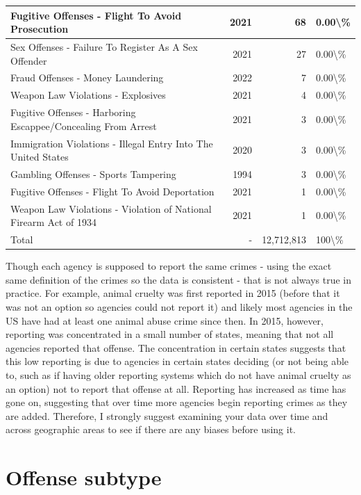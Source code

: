 \documentclass[
]{krantz}
\begin{document}
\begin{longtable}[t]{l|r|r|l}
\hline
Fugitive Offenses - Flight To Avoid Prosecution & 2021 & 68 & 0.00\textbackslash{}\%\\
\hline
Sex Offenses - Failure To Register As A Sex Offender & 2021 & 27 & 0.00\textbackslash{}\%\\
\hline
Fraud Offenses - Money Laundering & 2022 & 7 & 0.00\textbackslash{}\%\\
\hline
Weapon Law Violations - Explosives & 2021 & 4 & 0.00\textbackslash{}\%\\
\hline
Fugitive Offenses - Harboring Escappee/Concealing From Arrest & 2021 & 3 & 0.00\textbackslash{}\%\\
\hline
Immigration Violations - Illegal Entry Into The United States & 2020 & 3 & 0.00\textbackslash{}\%\\
\hline
Gambling Offenses - Sports Tampering & 1994 & 3 & 0.00\textbackslash{}\%\\
\hline
Fugitive Offenses - Flight To Avoid Deportation & 2021 & 1 & 0.00\textbackslash{}\%\\
\hline
Weapon Law Violations - Violation of National Firearm Act of 1934 & 2021 & 1 & 0.00\textbackslash{}\%\\
\hline
Total & - & 12,712,813 & 100\textbackslash{}\%\\
\hline
\end{longtable}

Though each agency is supposed to report the same crimes -
using the exact same definition of the crimes so the data is
consistent - that is not always true in practice. For
example, animal cruelty was first reported in 2015 (before
that it was not an option so agencies could not report it)
and likely most agencies in the US have had at least one
animal abuse crime since then. In 2015, however, reporting
was concentrated in a small number of states, meaning that
not all agencies reported that offense. The concentration in
certain states suggests that this low reporting is due to
agencies in certain states deciding (or not being able to,
such as if having older reporting systems which do not have
animal cruelty as an option) not to report that offense at
all. Reporting has increased as time has gone on, suggesting
that over time more agencies begin reporting crimes as they
are added. Therefore, I strongly suggest examining your data
over time and across geographic areas to see if there are
any biases before using it.

\section{Offense subtype}\label{offense-subtype}
\end{document}
